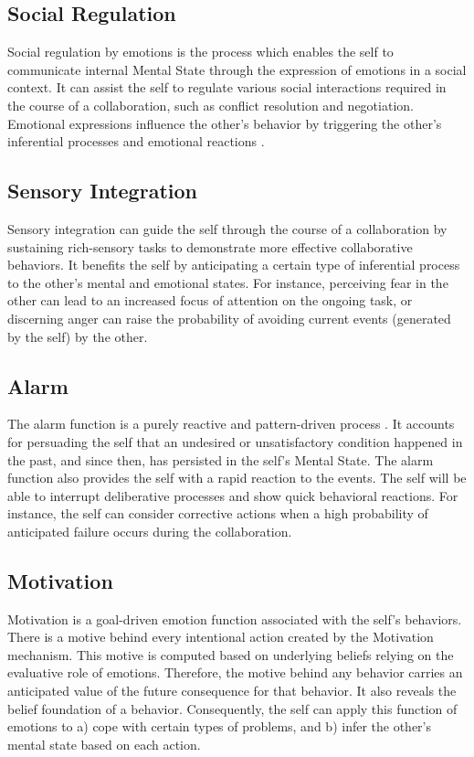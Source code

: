 \documentclass[12pt]{report}
\begin{document}
\subsection{Social Regulation} Social regulation by emotions is the process
which enables the self to communicate internal Mental State through the
expression of emotions in a social context. It can assist the self to regulate
various social interactions required in the course of a collaboration, such as
conflict resolution and negotiation. Emotional expressions influence the other's
behavior by triggering the other's inferential processes and emotional reactions
\cite{kleef:emotion-regulate-social}.

\subsection{Sensory Integration} Sensory integration can guide the self
through the course of a collaboration by sustaining rich-sensory tasks to
demonstrate more effective collaborative behaviors. It benefits the self by
anticipating a certain type of inferential process to the other's mental and
emotional states. For instance, perceiving fear in the other can lead to an
increased focus of attention on the ongoing task, or discerning anger can raise
the probability of avoiding current events (generated by the self) by the other.

\subsection{Alarm} \label{sub:emotion-alarm} The alarm function is a purely
reactive and pattern-driven process \cite{sloman:beyond-shallow}. It accounts
for persuading the self that an undesired or unsatisfactory condition happened
in the past, and since then, has persisted in the self's Mental State. The
alarm function also provides the self with a rapid reaction to the events. The
self will be able to interrupt deliberative processes and show quick behavioral
reactions. For instance, the self can consider corrective actions when a high
probability of anticipated failure occurs during the collaboration.

\subsection{Motivation} Motivation is a goal-driven emotion function
associated with the self's behaviors. There is a motive behind every intentional action
created by the Motivation mechanism. This motive is computed based on underlying
beliefs relying on the evaluative role of emotions. Therefore, the motive behind
any behavior carries an anticipated value of the future consequence for that
behavior. It also reveals the belief foundation of a behavior. Consequently, the
self can apply this function of emotions to a) cope with certain types of
problems, and b) infer the other's mental state based on each action.
\end{document}
